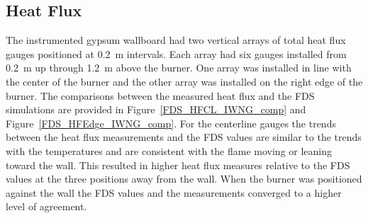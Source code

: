 \documentclass[twoside]{uocthesis}
\begin{document}
{\subsection{Heat Flux}

The instrumented gypsum wallboard had two vertical arrays of total heat flux gauges positioned at 0.2~m intervals.  Each array had six gauges installed from 0.2~m up through 1.2~m above the burner.  One array was installed in line with the center of the burner and the other array was installed on the right edge of the burner.  The comparisons between the measured heat flux and the FDS simulations are provided in Figure~\ref{FDS_HFCL_IWNG_comp} and Figure~\ref{FDS_HFEdge_IWNG_comp}.  For the centerline gauges the trends between the heat flux measurements and the FDS values are similar to the trends with the temperatures and are consistent with the flame moving or leaning toward the wall.  This resulted in higher heat flux measures relative to the FDS values at the three positions away from the wall. When the burner was positioned against the wall the FDS values and the measurements converged to a higher level of agreement. 

}
\end{document}

